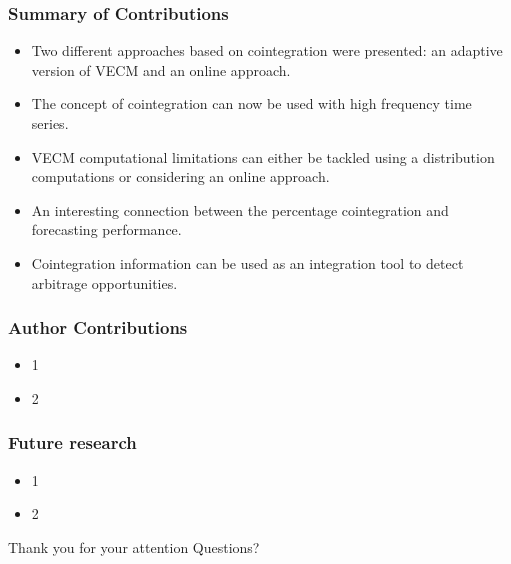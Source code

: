 \documentclass{beamer}
\begin{document}
\begin{frame}
\frametitle{Summary of Contributions}
\begin{itemize}
\item Two different approaches based on cointegration were presented: an adaptive version of VECM and an online approach.
\item The concept of cointegration can now be used with high frequency time series.
\item VECM computational limitations can either be tackled using a distribution computations or considering an online approach.
\item An interesting connection between the percentage cointegration and forecasting performance.
\item Cointegration information can be used as an integration tool to detect arbitrage opportunities.
\end{itemize}
\end{frame}

\begin{frame}
\frametitle{Author Contributions}
\begin{itemize}
\item 1
\item 2
\end{itemize}
\end{frame}


\begin{frame}
\frametitle{Future research}
\begin{itemize}
\item 1
\item 2
\end{itemize}
\end{frame}


\begin{frame}[plain,c]
\begin{center}
\Huge Thank you for your attention
\Huge Questions?
\end{center}
\end{frame}

\nocite{arce+salinas2012,icpram15,Arce2017}



%



\end{document}
